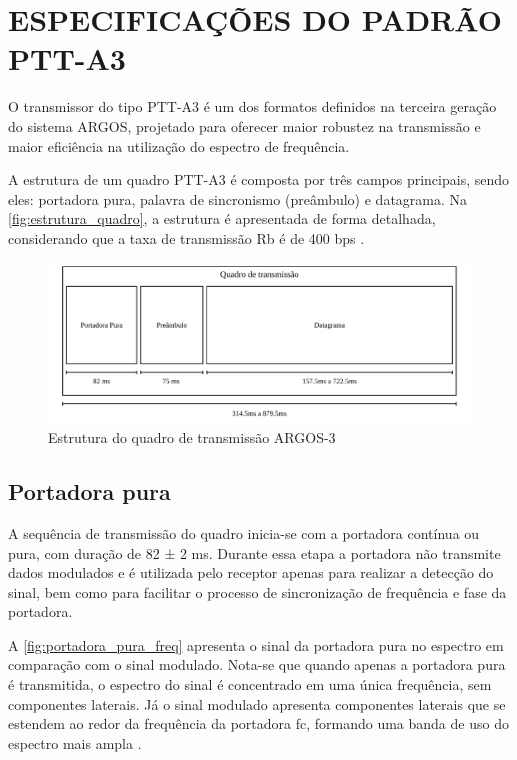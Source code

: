 \section{ESPECIFICAÇÕES DO PADRÃO PTT-A3}

O transmissor do tipo \gls{PTT-A3} é um dos formatos definidos na terceira geração do sistema \gls{ARGOS}, projetado para oferecer maior robustez na transmissão e maior eficiência na utilização do espectro de frequência. 

A estrutura de um quadro \gls{PTT-A3} é composta por três campos principais, sendo eles: portadora pura, palavra de sincronismo (preâmbulo) e datagrama. Na \autoref{fig:estrutura_quadro}, a estrutura é apresentada de forma detalhada, considerando que a taxa de transmissão \gls{Rb} é de 400 \gls{bps} \textcite{cnes_services_and_message_formats_ed2_rev2_2006}.

\begin{figure}[ht]
	\centering
	\caption{Estrutura do quadro de transmissão ARGOS-3}\label{fig:estrutura_quadro}
	\includegraphics[width=\linewidth]{assets/quadro.pdf}
\end{figure}

\subsection{Portadora pura}

A sequência de transmissão do quadro inicia-se com a portadora contínua ou pura, com duração de 82 ± 2 ms. Durante essa etapa a portadora não transmite dados modulados e é utilizada pelo receptor apenas para realizar a detecção do sinal, bem como para facilitar o processo de sincronização de frequência e fase da portadora. 

A \autoref{fig:portadora_pura_freq} apresenta o sinal da portadora pura no espectro em comparação com o sinal modulado. Nota-se que quando apenas a portadora pura é transmitida, o espectro do sinal é concentrado em uma única frequência, sem componentes laterais. Já o sinal modulado apresenta componentes laterais que se estendem ao redor da frequência da portadora \gls{fc}, formando uma banda de uso do espectro mais ampla \cite{cnes_services_and_message_formats_ed2_rev2_2006}.


